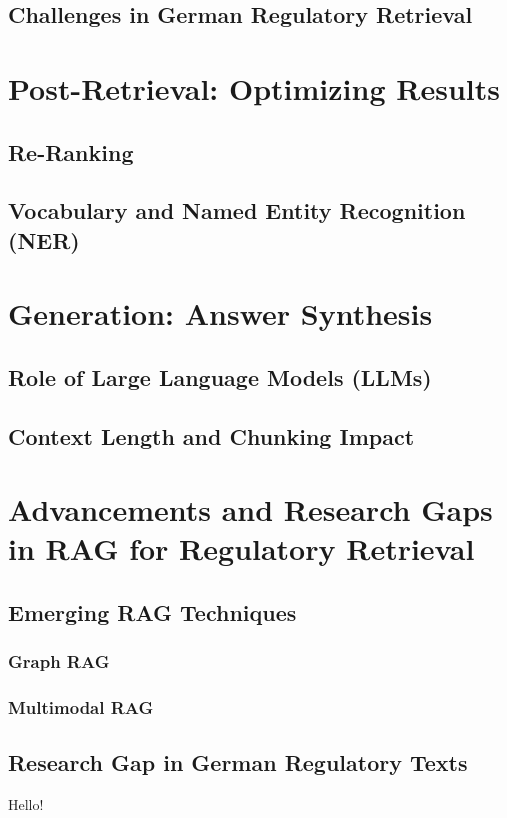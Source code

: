 \subsection{Challenges in German Regulatory Retrieval}
\section{Post-Retrieval: Optimizing Results}
\subsection{Re-Ranking}
\subsection{Vocabulary and Named Entity Recognition (NER)}
\section{Generation: Answer Synthesis}
\subsection{Role of Large Language Models (LLMs)}
\subsection{Context Length and Chunking Impact}
\section{Advancements and Research Gaps in RAG for Regulatory Retrieval}
\subsection{Emerging RAG Techniques}

\subsubsection{Graph RAG}

\subsubsection{Multimodal RAG}

\subsection{Research Gap in German Regulatory Texts}
Hello!